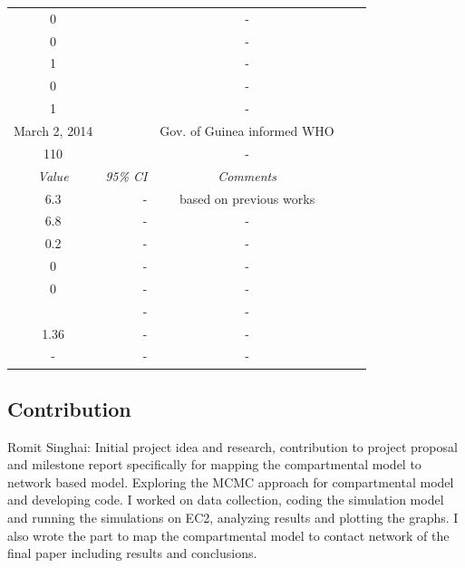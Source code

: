 \documentclass[10pt, journal,onecolumn]{IEEEtran}
\begin{document}
\begin{appendix}
\begin{table}[h]
{\begin{tabular}{@{}crccc@{}}
 0& & -\\
 0& & -\\
 1& & -\\
 0& & -\\
 1& &-\\
 March 2, 2014 &  & Gov. of Guinea informed WHO\\
110 & & -\\
\midrule
 \textit{Value} & \textit{95\% CI} & \textit{Comments} \\
\midrule
6.3 & - & based on previous works \cite{}\\
6.8 & - & -\\
0.2 & - & -\\
0 & - & -\\
0 & - & -\\
 & - & -\\
1.36 &- &-\\
- & - &-\\
\end{tabular}
}
\label{Table:parameter2}
\end{table}


\end{appendix}

\subsection*{\textbf{Contribution}}

Romit Singhai: Initial project idea and research,  contribution to project proposal and milestone report specifically for mapping the compartmental model to network based model. Exploring the MCMC approach for compartmental model  and developing code.
I worked on data collection, coding the simulation model and running the simulations on EC2, analyzing results and plotting the graphs. I also wrote the part to map the compartmental model to contact network of the final  paper including results and conclusions.
\end{document}
